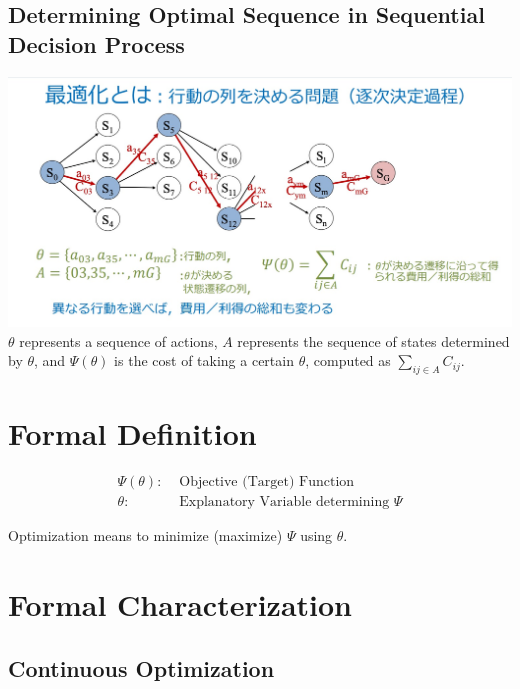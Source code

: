 \documentclass[
]{article}
\begin{document}
\hypertarget{determining-optimal-sequence-in-sequential-decision-process}{%
\subsection{Determining Optimal Sequence in Sequential Decision
Process}\label{determining-optimal-sequence-in-sequential-decision-process}}

\includegraphics{3.jpg} \(\theta\) represents a sequence of actions,
\(A\) represents the sequence of states determined by \(\theta\), and
\(\Psi(\theta)\) is the cost of taking a certain \(\theta\), computed as
\(\sum_{ij\in A} C_{ij}\).

\hypertarget{formal-definition}{%
\section{Formal Definition}\label{formal-definition}}

\[\begin{aligned}
\Psi(\theta):& \text{ Objective (Target) Function} \\
\theta:& \text{ Explanatory Variable determining } \Psi
\end{aligned}\]

Optimization means to minimize (maximize) \(\Psi\) using \(\theta\).

\hypertarget{formal-characterization}{%
\section{Formal Characterization}\label{formal-characterization}}

\hypertarget{continuous-optimization}{%
\subsection{Continuous Optimization}\label{continuous-optimization}}
\end{document}
